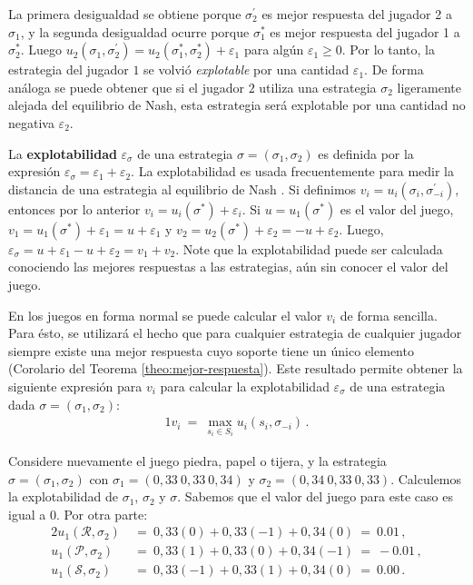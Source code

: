 La primera desigualdad se obtiene porque $\sigma^{\prime}_2$ es mejor respuesta del jugador 2 a $\sigma_1$, y la segunda desigualdad ocurre porque $\sigma^*_1$ es mejor respuesta del jugador 1 a $\sigma^*_2$. Luego $u_2(\sigma_1, \sigma^{\prime}_2) = u_2(\sigma^*_1, \sigma^*_2) + \varepsilon_1$ para algún $\varepsilon_1 \geq 0$. Por lo tanto, la estrategia del jugador $1$ se volvió \textit{explotable} por una cantidad $\varepsilon_1$. De forma análoga se puede obtener que si el jugador $2$ utiliza una estrategia $\sigma_2$ ligeramente alejada del equilibrio de Nash, esta estrategia será explotable por una cantidad no negativa $\varepsilon_2$.

La \textbf{explotabilidad} $\varepsilon_\sigma$ de una estrategia $\sigma = (\sigma_1, \sigma_2)$ es definida por la expresión $\varepsilon_{\sigma} = \varepsilon_1 + \varepsilon_2$. La explotabilidad es usada frecuentemente para medir la distancia de una estrategia al equilibrio de Nash \cite[p. 7]{bib:thesis-marc-lanctot}. Si definimos $v_i = u_i(\sigma_i, \sigma^{\prime}_{-i})$, entonces por lo anterior $v_i = u_i(\sigma^*) + \varepsilon_i$. Si $u=u_1(\sigma^*)$ es el valor del juego,  $v_1 = u_1(\sigma^*) + \varepsilon_1 = u + \varepsilon_1$ y $v_2 = u_2(\sigma^*) + \varepsilon_2 = -u + \varepsilon_2$. Luego, $\varepsilon_{\sigma} = u + \varepsilon_1 - u + \varepsilon_2 =  v_1 + v_2$. Note que la explotabilidad puede ser calculada conociendo las mejores respuestas a las estrategias, aún sin conocer el valor del juego.

En los juegos en forma normal se puede calcular el valor $v_i$ de forma sencilla. Para ésto, se utilizará el hecho que para cualquier estrategia de cualquier jugador siempre existe una mejor respuesta cuyo soporte tiene un único elemento (Corolario del Teorema \ref{theo:mejor-respuesta}). Este resultado permite obtener la siguiente expresión para $v_i$ para calcular la explotabilidad $\varepsilon_\sigma$ de una estrategia dada $\sigma=(\sigma_1,\sigma_2)$:
\begin{alignat}{1}
\label{eq:best-response-fn}
v_i\ =\ \max_{s_{i} \in S_{i}} u_i(s_i, \sigma_{-i}) \,.
\end{alignat}

Considere nuevamente el juego piedra, papel o tijera, y la estrategia $\sigma = (\sigma_1, \sigma_2)$ con $\sigma_1 = (0,33\ 0,33\ 0,34)$ y $\sigma_2 = (0,34\ 0,33\ 0,33)$. Calculemos la explotabilidad de $\sigma_1$, $\sigma_2$ y $\sigma$. Sabemos que el valor del juego para este caso es igual a $0$. Por otra parte:
\begin{alignat}{2}
u_1(\mathcal{R}, \sigma_2)\ &=\ 0,33(0)  +  0,33(-1) +  0,34(0)\  =\  0.01 \,, \\
u_1(\mathcal{P}, \sigma_2)\ &=\ 0,33(1)  +   0,33(0) +  0,34(-1)\ =\ -0.01 \,, \\
u_1(\mathcal{S}, \sigma_2)\ &=\ 0,33(-1) +   0,33(1) +  0,34(0)\  =\  0.00 \,.
\end{alignat}

